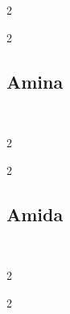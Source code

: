 \documentclass[\mainfilename]{subfiles}
\begin{document}
\begin{exampleBox}
\begin{multicols}{2}
        \begin{exampleBox}2{}\centering
            \\
        \end{exampleBox}
    
        \begin{exampleBox}2{}\centering
            \\
        \end{exampleBox}
    
    \end{multicols}
    
    \subsection*{Amina}\\
    \vspace{-4ex}
    \begin{multicols}{2}
    
        \begin{exampleBox}2{}\centering
            \\
        \end{exampleBox}
    
        \begin{exampleBox}2{}\centering
            \\
        \end{exampleBox}
    
    \end{multicols}
    
    \subsection*{Amida}\\
    \vspace{-4ex}
    \begin{multicols}{2}
    
        \begin{exampleBox}2{}\centering
            \\
        \end{exampleBox}
    
        \begin{exampleBox}2{}\centering
            \\
        \end{exampleBox}
    

\end{multicols}
\end{exampleBox}
\end{document}
